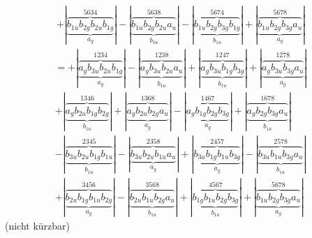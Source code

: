 \documentclass{article}
\begin{document}
\begin{multline*}
+\left|\underbrace{\overbrace{b_{1u} b_{2g} b_{2u} b_{1g}}^{5 6 3 4}}_{a_{g}}\right|-\left|\underbrace{\overbrace{b_{1u} b_{2g} b_{2u} a_{u}}^{5 6 3 8}}_{b_{1u}}\right|-\left|\underbrace{\overbrace{b_{1u} b_{2g} b_{3g} b_{1g}}^{5 6 7 4}}_{b_{1u}}\right|+\left|\underbrace{\overbrace{b_{1u} b_{2g} b_{3g} a_{u}}^{5 6 7 8}}_{a_{g}}\right|
\end{multline*}\begin{multline*}
=+\left|\underbrace{\overbrace{a_{g} b_{3u} b_{2u} b_{1g}}^{1 2 3 4}}_{a_{g}}\right|-\left|\underbrace{\overbrace{a_{g} b_{3u} b_{2u} a_{u}}^{1 2 3 8}}_{b_{1u}}\right|+\left|\underbrace{\overbrace{a_{g} b_{3u} b_{1g} b_{3g}}^{1 2 4 7}}_{b_{1u}}\right|+\left|\underbrace{\overbrace{a_{g} b_{3u} b_{3g} a_{u}}^{1 2 7 8}}_{a_{g}}\right|\\
+\left|\underbrace{\overbrace{a_{g} b_{2u} b_{1g} b_{2g}}^{1 3 4 6}}_{b_{1u}}\right|+\left|\underbrace{\overbrace{a_{g} b_{2u} b_{2g} a_{u}}^{1 3 6 8}}_{a_{g}}\right|-\left|\underbrace{\overbrace{a_{g} b_{1g} b_{2g} b_{3g}}^{1 4 6 7}}_{a_{g}}\right|+\left|\underbrace{\overbrace{a_{g} b_{2g} b_{3g} a_{u}}^{1 6 7 8}}_{b_{1u}}\right|\\
-\left|\underbrace{\overbrace{b_{3u} b_{2u} b_{1g} b_{1u}}^{2 3 4 5}}_{b_{1u}}\right|-\left|\underbrace{\overbrace{b_{3u} b_{2u} b_{1u} a_{u}}^{2 3 5 8}}_{a_{g}}\right|+\left|\underbrace{\overbrace{b_{3u} b_{1g} b_{1u} b_{3g}}^{2 4 5 7}}_{a_{g}}\right|-\left|\underbrace{\overbrace{b_{3u} b_{1u} b_{3g} a_{u}}^{2 5 7 8}}_{b_{1u}}\right|\\
+\left|\underbrace{\overbrace{b_{2u} b_{1g} b_{1u} b_{2g}}^{3 4 5 6}}_{a_{g}}\right|-\left|\underbrace{\overbrace{b_{2u} b_{1u} b_{2g} a_{u}}^{3 5 6 8}}_{b_{1u}}\right|+\left|\underbrace{\overbrace{b_{1g} b_{1u} b_{2g} b_{3g}}^{4 5 6 7}}_{b_{1u}}\right|+\left|\underbrace{\overbrace{b_{1u} b_{2g} b_{3g} a_{u}}^{5 6 7 8}}_{a_{g}}\right|
\end{multline*}(nicht kürzbar)\\ \\
\vspace{0.5cm}
\end{document}
